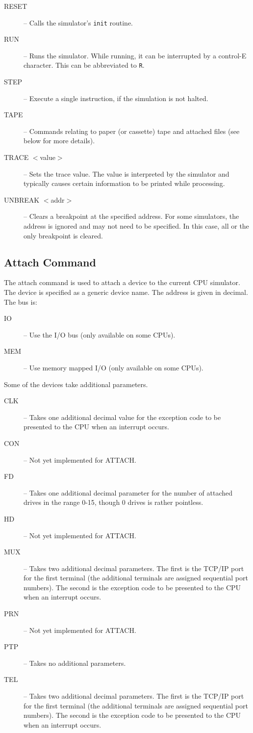 \documentclass[10pt, openany]{book}
\begin{document}
\begin{description}
  \item[RESET] -- Calls the simulator's \verb|init| routine.
  \item[RUN] -- Runs the simulator.  While running, it can be interrupted by a control-E character.  This can be abbreviated to \verb|R|.
  \item[STEP] -- Execute a single instruction, if the simulation is not halted.
  \item[TAPE] -- Commands relating to paper (or cassette) tape and attached files (see below for more details).
  \item[TRACE $<$value$>$] -- Sets the trace value.  The value is interpreted by the simulator and typically causes certain information to be printed while processing.
  \item[UNBREAK $<$addr$>$] -- Clears a breakpoint at the specified address.  For some simulators, the address is ignored and may not need to be specified.  In this case, all or the only breakpoint is cleared.
\end{description}

\subsection{Attach Command}
\label{cli:Attach}
The attach command is used to attach a device to the current CPU simulator.  The device is specified as a generic device name.  The address is given in decimal.  The bus is:
\begin{description}
  \item[IO] -- Use the I/O bus (only available on some CPUs).
  \item[MEM] -- Use memory mapped I/O (only available on some CPUs).
\end{description}
Some of the devices take additional parameters.
\begin{description}
  \item[CLK] -- Takes one additional decimal value for the exception code to be presented to the CPU when an interrupt occurs.
  \item[CON] -- Not yet implemented for ATTACH.
  \item[FD] -- Takes one additional decimal parameter for the number of attached drives in the range 0-15, though 0 drives is rather pointless.
  \item[HD] -- Not yet implemented for ATTACH.
  \item[MUX] -- Takes two additional decimal parameters.  The first is the TCP/IP port for the first terminal (the additional terminals are assigned sequential port numbers).  The second is the exception code to be presented to the CPU when an interrupt occurs.
  \item[PRN] -- Not yet implemented for ATTACH.
  \item[PTP] -- Takes no additional parameters.
  \item[TEL] --  Takes two additional decimal parameters.  The first is the TCP/IP port for the first terminal (the additional terminals are assigned sequential port numbers).  The second is the exception code to be presented to the CPU when an interrupt occurs.
\end{description}
\end{document}
